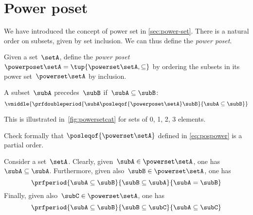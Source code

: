 \section{Power poset}

We have introduced the concept of power set in \cref{sec:power-set}.
There is a natural order on subsets, given by set inclusion.
We can thus define the \emph{power poset}.

\begin{definition}
    \label{def:power-poset}
    Given a set~$\setA$,
    define the \emph{power poset}~$\powerposet\setA = \tup{\powerset\setA,\subseteq}$ by ordering the subsets in its power set~$\powerset\setA$ by inclusion.

    A subset~$\subA$ precedes~$\subB$ if~$\subA \subseteq \subB$:
    \begin{equation}\label{eq:pospower}
        \vmiddle{
            \prfdoubleperiod{
                \subA \posleqof{\powerposet\setA} \subB
            }{
                \subA \subseteq \subB
            }
        }
    \end{equation}
\end{definition}
This is illustrated in~\cref{fig:powersetcat} for sets of 0, 1, 2, 3 elements.
\begin{exercise}
    Check formally that $\posleqof{\powerset\setA}$ defined in \cref{eq:pospower} is a partial order.
\end{exercise}
\begin{solution}
    Consider a set~$\setA$.
    Clearly, given~$\subA\in \powerset \setA$, one has~$\subA\subseteq \subA$.
    Furthermore, given also~$\subB\in \powerset \setA$, one has
    \begin{equation*}
        \prfperiod{\subA\subseteq \subB}{\subB\subseteq \subA}{\subA=\subB}
    \end{equation*}
    Finally, given also~$\subC\in \powerset \setA$, one has
    \begin{equation*}
        \prfperiod{\subA\subseteq \subB}{\subB\subseteq \subC}{\subA\subseteq\subC}
    \end{equation*}
\end{solution}
\vfill
\begin{figure*}[h]
    \centering
    \hfill
    \hfill
    \hfill
    \caption{Power set as a poset.
    }
    \label{fig:powersetcat}
\end{figure*}
\vfill
